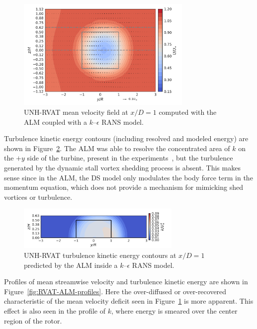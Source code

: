\documentclass[times]{weauth}
\begin{document}
\begin{figure}
    \centering

    \includegraphics[width=0.75\textwidth]{RVAT-ALM_meancontquiv}

    \caption{UNH-RVAT mean velocity field at $x/D=1$ computed with the ALM
        coupled with a $k$--$\epsilon$ RANS model.}

    \label{fig:RVAT-ALM-meancontquiv}
\end{figure}

Turbulence kinetic energy contours (including resolved and modeled energy) are
shown in Figure~\ref{fig:RVAT-ALM-kcont}. The ALM was able to resolve the
concentrated area of $k$ on the $+y$ side of the turbine, present in the
experiments~\cite{Bachant2015-JoT}, but the turbulence generated by the dynamic
stall vortex shedding process is absent. This makes sense since in the ALM, the
DS model only modulates the body force term in the momentum equation, which does
not provide a mechanism for mimicking shed vortices or turbulence.

\begin{figure}
    \centering

    \includegraphics[width=0.7\textwidth]{RVAT-ALM_kcont}

    \caption{UNH-RVAT turbulence kinetic energy contours at $x/D=1$ predicted by
        the ALM inside a $k$--$\epsilon$ RANS model.}

    \label{fig:RVAT-ALM-kcont}
\end{figure}

Profiles of mean streamwise velocity and turbulence kinetic energy are shown in
Figure~\ref{fig:RVAT-ALM-profiles}. Here the over-diffused or over-recovered
characteristic of the mean velocity deficit seen in
Figure~\ref{fig:RVAT-ALM-meancontquiv} is more apparent. This effect is also
seen in the profile of $k$, where energy is smeared over the center region of
the rotor.
\end{document}
